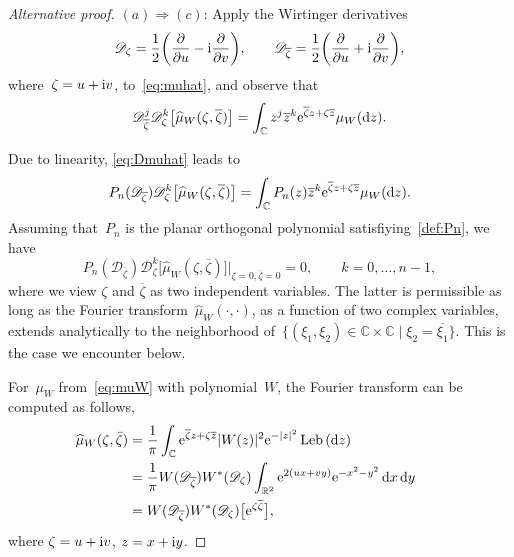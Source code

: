 \documentclass[10pt,a4paper]{article}
\numberwithin{equation}{section}
\DeclareMathOperator{\Leb}{Leb}
\newcommand*{\Cset}{\mathbb{C}} %
\newcommand*{\Rset}{\mathbb{R}} %
\begin{document}
 \begin{proof}[Alternative proof]
 $(a) \Rightarrow (c)$:
 Apply the Wirtinger derivatives
 \begin{equation*}
 \mathscr{D}_{\zeta} = \frac{1}{2}\bigg(\frac{\partial}{\partial u} - {\rm i} \frac{\partial}{\partial v}\bigg), \qquad
 \mathscr{D}_{\overline{\zeta}} = \frac{1}{2}\bigg(\frac{\partial}{\partial u} + {\rm i} \frac{\partial}{\partial v}\bigg),
 \end{equation*}
 where~$\zeta = u + {\rm i}v$, to~\eqref{eq:muhat}, and observe that
 \begin{equation}
 \label{eq:Dmuhat}
 \mathscr{D}_{\overline{\zeta}}^j \mathscr{D}_{\zeta}^k \big[\widehat{\mu}_W(\zeta, \overline{\zeta})\big] = \int_{\Cset} z^j \overline{z}^k {\rm e}^{\overline{\zeta} z + \zeta \overline{z}} \mu_W({\rm d}z).
 \end{equation}

 Due to linearity, \eqref{eq:Dmuhat} leads to
 \begin{equation*}
 P_n(\mathscr{D}_{\overline{\zeta}}) \mathscr{D}_{\zeta}^k \big[ \widehat{\mu}_W(\zeta, \overline{\zeta}) \big] = \int_{\Cset} P_n(z) \overline{z}^k {\rm e}^{\overline{\zeta} z + \zeta \overline{z}} \mu_W({\rm d}z).
 \end{equation*}
 Assuming that~$P_n$ is the planar orthogonal polynomial satisfiying~\eqref{def:Pn}, we have
 \begin{equation}
 \label{eq:remeq2}
 P_n(\mathscr{D}_{\overline{\zeta}}) \mathscr{D}_{\zeta}^k \big[ \widehat{\mu}_W(\zeta,\overline{\zeta}) \big] \big|_{\zeta=0, \overline{\zeta} = 0}= 0, \qquad k=0,\dots,n-1,
 \end{equation}
 where we view $\zeta$ and $\overline{\zeta}$ as two independent variables. The latter is permissible as long as the Fourier transform~$\widehat{\mu}_W(\cdot,\cdot)$, as a function of two complex variables, extends analytically to the neighborhood of~$\big\{(\xi_1,\xi_2) \in \Cset \times \Cset\mid \xi_2=\overline{\xi_1}\big\}$. This is the case we encounter below.

 For~$\mu_W$ from~\eqref{eq:muW} with polynomial~$W$, the Fourier transform can be computed as follows,
 \begin{align}
 \label{eq:hatmuW}
 \widehat{\mu}_W(\zeta,\bar{\zeta}) &=\frac{1}{\pi} \int_{\Cset} {\rm e}^{ \overline{\zeta} z + \zeta \overline{z}} |W(z)|^2 {\rm e}^{-|z|^2} \Leb{({\rm d}z)}\nonumber
 \\
 &= \frac{1}{\pi} W(\mathscr{D}_{\overline{\zeta}})W^*(\mathscr{D}_\zeta) \int_{\Rset^2} {\rm e}^{2(u x + v y)} {\rm e}^{-x^2 -y^2}\, {\rm d}x\,{\rm d}y \qquad
\nonumber
 \\
 &= W(\mathscr{D}_{\overline{\zeta}})W^*(\mathscr{D}_\zeta) \big[{\rm e}^{\zeta \overline{\zeta}} \big],
 \end{align}
 where $\zeta = u + {\rm i}v$, $z=x+ {\rm i}y$.


\end{proof}
\end{document}
